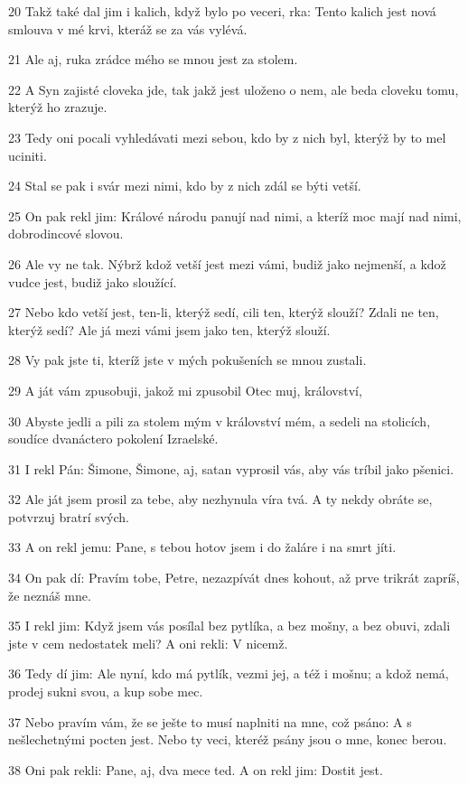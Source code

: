 \par 20 Takž také dal jim i kalich, když bylo po veceri, rka: Tento kalich jest nová smlouva v mé krvi, kteráž se za vás vylévá.
\par 21 Ale aj, ruka zrádce mého se mnou jest za stolem.
\par 22 A Syn zajisté cloveka jde, tak jakž jest uloženo o nem, ale beda cloveku tomu, kterýž ho zrazuje.
\par 23 Tedy oni pocali vyhledávati mezi sebou, kdo by z nich byl, kterýž by to mel uciniti.
\par 24 Stal se pak i svár mezi nimi, kdo by z nich zdál se býti vetší.
\par 25 On pak rekl jim: Králové národu panují nad nimi, a kteríž moc mají nad nimi, dobrodincové slovou.
\par 26 Ale vy ne tak. Nýbrž kdož vetší jest mezi vámi, budiž jako nejmenší, a kdož vudce jest, budiž jako sloužící.
\par 27 Nebo kdo vetší jest, ten-li, kterýž sedí, cili ten, kterýž slouží? Zdali ne ten, kterýž sedí? Ale já mezi vámi jsem jako ten, kterýž slouží.
\par 28 Vy pak jste ti, kteríž jste v mých pokušeních se mnou zustali.
\par 29 A ját vám zpusobuji, jakož mi zpusobil Otec muj, království,
\par 30 Abyste jedli a pili za stolem mým v království mém, a sedeli na stolicích, soudíce dvanáctero pokolení Izraelské.
\par 31 I rekl Pán: Šimone, Šimone, aj, satan vyprosil vás, aby vás tríbil jako pšenici.
\par 32 Ale ját jsem prosil za tebe, aby nezhynula víra tvá. A ty nekdy obráte se, potvrzuj bratrí svých.
\par 33 A on rekl jemu: Pane, s tebou hotov jsem i do žaláre i na smrt jíti.
\par 34 On pak dí: Pravím tobe, Petre, nezazpívát dnes kohout, až prve trikrát zapríš, že neznáš mne.
\par 35 I rekl jim: Když jsem vás posílal bez pytlíka, a bez mošny, a bez obuvi, zdali jste v cem nedostatek meli? A oni rekli: V nicemž.
\par 36 Tedy dí jim: Ale nyní, kdo má pytlík, vezmi jej, a též i mošnu; a kdož nemá, prodej sukni svou, a kup sobe mec.
\par 37 Nebo pravím vám, že se ješte to musí naplniti na mne, což psáno: A s nešlechetnými pocten jest. Nebo ty veci, kteréž psány jsou o mne, konec berou.
\par 38 Oni pak rekli: Pane, aj, dva mece ted. A on rekl jim: Dostit jest.
